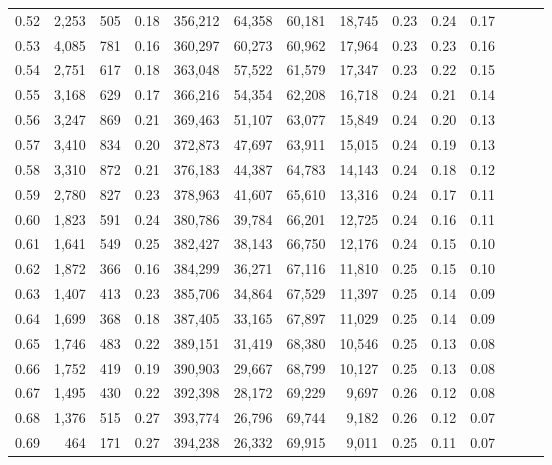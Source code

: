 \begin{tabular}{rrrrrrrrrrrrrr}
0.52 &   2,253 &    505 &  0.18 &  356,212 &   64,358 &  60,181 &  18,745 &  0.23 &  0.24 &      0.17 \\
0.53 &   4,085 &    781 &  0.16 &  360,297 &   60,273 &  60,962 &  17,964 &  0.23 &  0.23 &      0.16 \\
0.54 &   2,751 &    617 &  0.18 &  363,048 &   57,522 &  61,579 &  17,347 &  0.23 &  0.22 &      0.15 \\
0.55 &   3,168 &    629 &  0.17 &  366,216 &   54,354 &  62,208 &  16,718 &  0.24 &  0.21 &      0.14 \\
0.56 &   3,247 &    869 &  0.21 &  369,463 &   51,107 &  63,077 &  15,849 &  0.24 &  0.20 &      0.13 \\
0.57 &   3,410 &    834 &  0.20 &  372,873 &   47,697 &  63,911 &  15,015 &  0.24 &  0.19 &      0.13 \\
0.58 &   3,310 &    872 &  0.21 &  376,183 &   44,387 &  64,783 &  14,143 &  0.24 &  0.18 &      0.12 \\
0.59 &   2,780 &    827 &  0.23 &  378,963 &   41,607 &  65,610 &  13,316 &  0.24 &  0.17 &      0.11 \\
0.60 &   1,823 &    591 &  0.24 &  380,786 &   39,784 &  66,201 &  12,725 &  0.24 &  0.16 &      0.11 \\
0.61 &   1,641 &    549 &  0.25 &  382,427 &   38,143 &  66,750 &  12,176 &  0.24 &  0.15 &      0.10 \\
0.62 &   1,872 &    366 &  0.16 &  384,299 &   36,271 &  67,116 &  11,810 &  0.25 &  0.15 &      0.10 \\
0.63 &   1,407 &    413 &  0.23 &  385,706 &   34,864 &  67,529 &  11,397 &  0.25 &  0.14 &      0.09 \\
0.64 &   1,699 &    368 &  0.18 &  387,405 &   33,165 &  67,897 &  11,029 &  0.25 &  0.14 &      0.09 \\
0.65 &   1,746 &    483 &  0.22 &  389,151 &   31,419 &  68,380 &  10,546 &  0.25 &  0.13 &      0.08 \\
0.66 &   1,752 &    419 &  0.19 &  390,903 &   29,667 &  68,799 &  10,127 &  0.25 &  0.13 &      0.08 \\
0.67 &   1,495 &    430 &  0.22 &  392,398 &   28,172 &  69,229 &   9,697 &  0.26 &  0.12 &      0.08 \\
0.68 &   1,376 &    515 &  0.27 &  393,774 &   26,796 &  69,744 &   9,182 &  0.26 &  0.12 &      0.07 \\
0.69 &     464 &    171 &  0.27 &  394,238 &   26,332 &  69,915 &   9,011 &  0.25 &  0.11 &      0.07 \\

\end{tabular}
